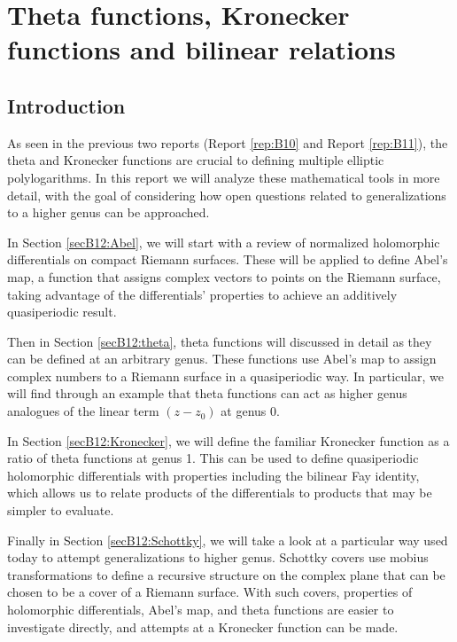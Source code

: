 

\newcommand{\bolde}[0]{\mathbf{e}}

\newcommand{\hcancel}[2][black]{\setbox0=\hbox{$#2$}\rlap{\raisebox{.3\ht0}{\textcolor{#1}{\rule{\wd0}{1pt}}}}#2} 

\chapter{Theta functions, Kronecker functions and bilinear relations}
\label{rep:B12}

\section{Introduction}

As seen in the previous two reports (Report \ref{rep:B10} and Report \ref{rep:B11}), the theta and Kronecker functions are crucial to defining multiple elliptic polylogarithms. In this report we will analyze these mathematical tools in more detail, with the goal of considering how open questions related to generalizations to a higher genus can be approached.

In Section \ref{secB12:Abel}, we will start with a review of normalized holomorphic differentials on compact Riemann surfaces. These will be applied to define Abel's map, a function that assigns complex vectors to points on the Riemann surface, taking advantage of the differentials' properties to achieve an additively quasiperiodic result.

Then in Section \ref{secB12:theta}, theta functions will discussed in detail as they can be defined at an arbitrary genus. These functions use Abel's map to assign complex numbers to a Riemann surface in a quasiperiodic way. In particular, we will find through an example that theta functions can act as higher genus analogues of the linear term $(z-z_0)$ at genus 0.

In Section \ref{secB12:Kronecker}, we will define the familiar Kronecker function as a ratio of theta functions at genus 1. This can be used to define quasiperiodic holomorphic differentials with properties including the bilinear Fay identity, which allows us to relate products of the differentials to products that may be simpler to evaluate.

Finally in Section \ref{secB12:Schottky}, we will take a look at a particular way used today to attempt generalizations to higher genus. Schottky covers use mobius transformations to define a recursive structure on the complex plane that can be chosen to be a cover of a Riemann surface. With such covers, properties of holomorphic differentials, Abel's map, and theta functions are easier to investigate directly, and attempts at a Kronecker function can be made.

